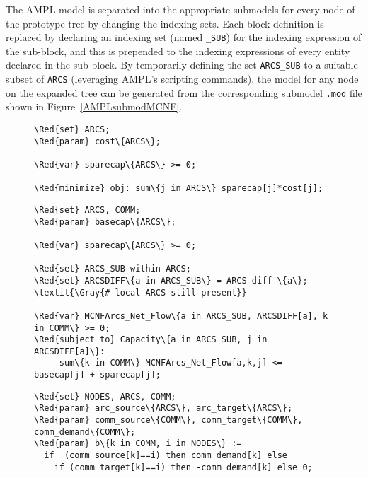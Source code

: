 \documentclass[10pt,a4paper]{book}
\begin{document}
\begin{verbtaim}
The AMPL model is separated into the appropriate submodels for every node
of the prototype tree by changing the indexing sets.
Each block definition is replaced
by declaring an indexing set (named {\tt *\_SUB}) for the
indexing expression of the sub-block, and this is prepended to the
indexing expressions of every entity declared in the sub-block. By
temporarily defining the set {\tt ARCS\_SUB} to a suitable subset of {\tt ARCS} 
(leveraging AMPL's scripting commands), the
model for any node on the expanded tree can be generated from the
corresponding submodel {\tt *.mod} file shown in Figure~\ref{AMPLsubmodMCNF}.


\begin{figure}
{\small
\begin{Verbatim}[frame=single,framerule=0.2pt,framesep=5pt,commandchars=\\\{\}]
%------------------------------- root.mod --------------------------------
\Red{set} ARCS;
\Red{param} cost\{ARCS\};

\Red{var} sparecap\{ARCS\} >= 0;

\Red{minimize} obj: sum\{j in ARCS\} sparecap[j]*cost[j];
\end{Verbatim}
\begin{Verbatim}[frame=single,framerule=0.2pt,framesep=5pt,commandchars=\\\{\}]
% -------------------------- root_MCNFArcs.mod ----------------------------
\Red{set} ARCS, COMM;
\Red{param} basecap\{ARCS\};

\Red{var} sparecap\{ARCS\} >= 0;

\Red{set} ARCS_SUB within ARCS;
\Red{set} ARCSDIFF\{a in ARCS_SUB\} = ARCS diff \{a\};  \textit{\Gray{# local ARCS still present}}

\Red{var} MCNFArcs_Net_Flow\{a in ARCS_SUB, ARCSDIFF[a], k in COMM\} >= 0;
\Red{subject to} Capacity\{a in ARCS_SUB, j in ARCSDIFF[a]\}:
     sum\{k in COMM\} MCNFArcs_Net_Flow[a,k,j] <= basecap[j] + sparecap[j];
\end{Verbatim}
\begin{Verbatim}[frame=single,framerule=0.2pt,framesep=5pt,commandchars=\\\{\}]
% -------------------------- root_MCNFArcs_Net.mod ----------------------------
\Red{set} NODES, ARCS, COMM;
\Red{param} arc_source\{ARCS\}, arc_target\{ARCS\};
\Red{param} comm_source\{COMM\}, comm_target\{COMM\}, comm_demand\{COMM\};
\Red{param} b\{k in COMM, i in NODES\} := 
  if  (comm_source[k]==i) then comm_demand[k] else 
    if (comm_target[k]==i) then -comm_demand[k] else 0;


\end{Verbatim}}
\end{figure}
\end{verbtaim}
\end{document}
